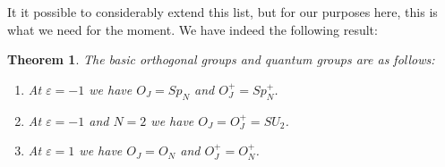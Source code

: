 \documentclass[12pt]{amsbook}
\newtheorem{theorem}{Theorem}[chapter]
\begin{document}
It it possible to considerably extend this list, but for our purposes here, this is what we need for the moment. We have indeed the following result:

\begin{theorem}
The basic orthogonal groups and quantum groups are as follows:
\begin{enumerate}
\item At $\varepsilon=-1$ we have $O_J=Sp_N$ and $O_J^+=Sp_N^+$.

\item At $\varepsilon=-1$ and $N=2$ we have $O_J=O_J^+=SU_2$.

\item At $\varepsilon=1$ we have $O_J=O_N$ and $O_J^+=O_N^+$.
\end{enumerate}
\end{theorem}
\end{document}
